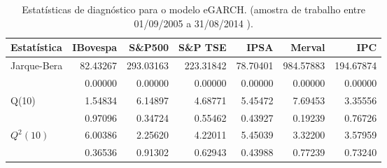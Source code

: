 \begin{table}[H]
\centering
\caption{Estatísticas de diagnóstico para o modelo eGARCH. 
               (amostra de trabalho entre 01/09/2005 a 31/08/2014 ).} 
\label{tab:garchstats}
\begin{tabular}{lrrrrrr}
  \hline
Estatística & IBovespa & S\&P500 & S\&P TSE & IPSA & Merval & IPC \\ 
  \hline
Jarque-Bera & 82.43267 & 293.03163 & 223.31842 & 78.70401 & 984.57883 & 194.67874 \\ 
   & 0.00000 & 0.00000 & 0.00000 & 0.00000 & 0.00000 & 0.00000 \\ 
  Q(10) & 1.54834 & 6.14897 & 4.68771 & 5.45472 & 7.69453 & 3.35556 \\ 
   & 0.97096 & 0.34724 & 0.55462 & 0.43927 & 0.19239 & 0.76726 \\ 
  $Q^2(10)$ & 6.00386 & 2.25620 & 4.22011 & 5.45039 & 3.32200 & 3.57959 \\ 
   & 0.36536 & 0.91302 & 0.62943 & 0.43988 & 0.77239 & 0.73240 \\ 
   \hline
\end{tabular}
\end{table}
